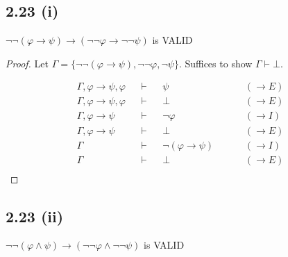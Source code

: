 \documentclass[12pt]{article}
\begin{document}
\subsection*{2.23 (i)} 
$\neg \neg(\varphi \rightarrow \psi) \rightarrow (\neg \neg \varphi \rightarrow \neg \neg \psi)$ is VALID

\begin{proof}
Let $\Gamma = \{\neg \neg (\varphi \rightarrow \psi), \neg \neg \varphi, \neg \psi\}$. Suffices to show $\Gamma \vdash \bot$.

\begin{align*}
    \Gamma, \varphi \rightarrow \psi, \varphi &&\vdash&& \psi &&&& (\rightarrow E) \\
    \Gamma, \varphi \rightarrow \psi, \varphi &&\vdash&& \bot &&&& (\rightarrow E) \\
    \Gamma, \varphi \rightarrow \psi &&\vdash&& \neg \varphi &&&& (\rightarrow I) \\
    \Gamma, \varphi \rightarrow \psi &&\vdash&& \bot &&&& (\rightarrow E) \\
    \Gamma &&\vdash&& \neg (\varphi \rightarrow \psi) &&&& (\rightarrow I) \\
    \Gamma &&\vdash&& \bot &&&& (\rightarrow E) \\
\end{align*}
\end{proof}

\subsection*{2.23 (ii)}
$\neg \neg(\varphi \wedge \psi) \rightarrow (\neg \neg \varphi \wedge \neg \neg \psi)$ is VALID
\end{document}
